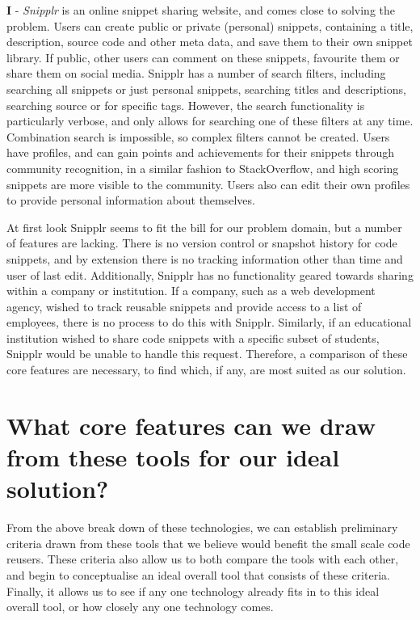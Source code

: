 \textbf{I} - \textit{Snipplr} is an online snippet sharing website, and comes close to solving the problem. Users can create public or private (personal) snippets, containing a title, description, source code and other meta data, and save them to their own snippet library. If public, other users can comment on these snippets, favourite them or share them on social media. Snipplr has a number of search filters, including searching all snippets or just personal snippets, searching titles and descriptions, searching source or for specific tags. However, the search functionality is particularly verbose, and only allows for searching one of these filters at any time. Combination search is impossible, so complex filters cannot be created.
Users have profiles, and can gain points and achievements for their snippets through community recognition, in a similar fashion to StackOverflow, and high scoring snippets are more visible to the community. Users also can edit their own profiles to provide personal information about themselves.

At first look Snipplr seems to fit the bill for our problem domain, but a number of features are lacking. There is no version control or snapshot history for code snippets, and by extension there is no tracking information other than time and user of last edit. Additionally, Snipplr has no functionality geared towards sharing within a company or institution. If a company, such as a web development agency, wished to track reusable snippets and provide access to a list of employees, there is no process to do this with Snipplr. Similarly, if an educational institution wished to share code snippets with a specific subset of students, Snipplr would be unable to handle this request. Therefore, a comparison of these core features are necessary, to find which, if any, are most suited as our solution.

\section{What core features can we draw from these tools for our ideal solution?}
From the above break down of these technologies, we can establish preliminary criteria drawn from these tools that we believe would benefit the small scale code reusers. These criteria also allow us to both compare the tools with each other, and begin to conceptualise an ideal overall tool that consists of these criteria. Finally, it allows us to see if any one technology already fits in to this ideal overall tool, or how closely any one technology comes.

